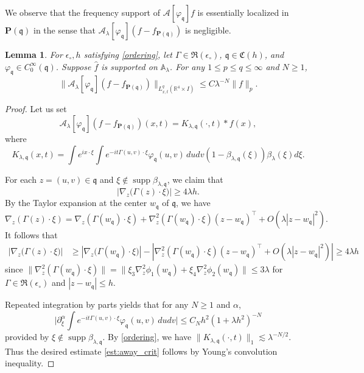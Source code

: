 \documentclass[10pt] %
{amsart}
\theoremstyle{plain}
\newtheorem{lem}[thm]{Lemma}
\numberwithin{equation}{section}
\newcommand{\R}{\mathbb R}
\DeclareMathOperator{\supp}{supp}
\newcommand{\fq}{\mathfrak q}
\begin{document}
We observe that the frequency support of $\mathcal A[\varphi_{\fq}]f$ is essentially localized in $\mathbf P(\fq)$ in the sense that $\mathcal A_{\lambda}[\varphi_{\fq}](f-f_{\mathbf P(\fq)})$ is negligible. 





\begin{lem}\label{lem:away_crit}
For $\epsilon_\circ, h $ satisfying \eqref{ordering}, 
let $\Gamma \in \mathfrak R (\epsilon_\circ)$, $\fq \in \mathfrak C(h)$,
and $\varphi_{\fq} \in C_0^\infty(\fq)$. 
Suppose  $\widehat f$ is supported on $ \mathbb A_\lambda$.
For any $1\le p \le q \le \infty$ and $N\ge1$,
\begin{equation}\label{est:away_crit}
\big\| \mathcal A_\lambda [\varphi_{\fq}](f-f_{\mathbf P(\fq)})\big\|_{L_{x,t}^q(\R^4 \times I)} \le C\lambda^{-N}\|f\|_p .
\end{equation}
\end{lem}



\begin{proof}
Let us set 
\[
 \mathcal A_\lambda [\varphi_{\fq}](f-f_{\mathbf P(\fq)})(x,t)=K_{\lambda, \fq}(\cdot,t)\ast f(x) ,
 \] 
 where 
\[
K_{\lambda,\fq}(x,t)=\int e^{ i x\cdot \xi} \int e^{-it \Gamma(u,v)\cdot \xi}\varphi_{\fq}(u,v)\,dudv (1-\beta_{\lambda,\fq}(\xi))\beta_\lambda(\xi ) d\xi.
\]

For each $z =(u,v)  \in\fq$ and $\xi \notin \supp \beta_{\lambda,\fq}$,  we claim that  
\[ 
|\nabla_{z}\big(\Gamma(z)\cdot \xi\big) |\ge  4\lambda h. 
\]
By the  Taylor expansion at the center $w_\fq$ of $\fq$, we have
\[
\nabla_z (\Gamma(z)\cdot\xi) = \nabla_z (\Gamma(w_\fq)\cdot\xi) + \nabla_z^2 (\Gamma(w_\fq)\cdot\xi) (z-  w_\fq)^\intercal  +O(\lambda |z- w_\fq|^2) .
\]
It follows that
\begin{align*}
| \nabla_z \big(\Gamma(z)\cdot\xi\big)| 
& \ge |\nabla_z \big( \Gamma(w_\fq)\cdot \xi \big)| - | \nabla_z^2 (\Gamma(w_\fq)\cdot \xi) (z-  w_\fq)^\intercal +O(\lambda|z- w_\fq|^2) | 
 \ge  4  \lambda h   
\end{align*}
since $\| \nabla_z^2 (\Gamma(w_\fq)\cdot\xi)\|  = \|\xi_3\nabla_z^2\phi_1(w_\fq)+ \xi_4 \nabla_z^2\phi_2(w_\fq)\| \le 3\lambda $ for $\Gamma \in \mathfrak R(\epsilon_\circ)$ and  $|z - w_\fq|  \le h $.


Repeated integration by parts yields that for any $N\ge1$ and $\alpha$,
\begin{equation*}
\big|\partial_\xi^\alpha\int e^{-it \Gamma(u,v)\cdot \xi}\varphi_{\fq}(u,v)\,dudv \big|\le C_N h^2  (1+ \lambda h^2 )^{-N}
\end{equation*}
provided by $\xi \notin \supp \beta_{\lambda,\fq}$. 
By \eqref{ordering}, 
we have $\|K_{\lambda,\fq}(\cdot,t)\|_1\lesssim \lambda^{-N/2}$. Thus the desired estimate \eqref{est:away_crit} follows by Young's convolution inequality.
\end{proof}
\end{document}
